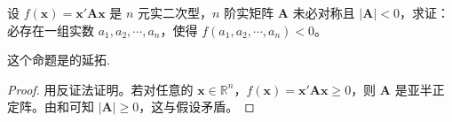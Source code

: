 \documentclass[../../main.tex]{subfiles}%
\begin{document}
\begin{proposition}\label{proposition:对应矩阵的行列式小于零的二次型必存在小于零的一点}
设 \(f(\boldsymbol{x})=\boldsymbol{x}'\boldsymbol{A}\boldsymbol{x}\) 是 \(n\) 元实二次型，\(n\) 阶实矩阵 \(\boldsymbol{A}\) 未必对称且 \(|\boldsymbol{A}|<0\)，求证：必存在一组实数 \(a_1,a_2,\cdots,a_n\)，使得 \(f(a_1,a_2,\cdots,a_n)<0\)。
\end{proposition}
\begin{remark}
这个命题是的延拓.
\end{remark}
\begin{proof}

用反证法证明。若对任意的 \(\boldsymbol{x}\in\mathbb{R}^n\)，\(f(\boldsymbol{x})=\boldsymbol{x}'\boldsymbol{A}\boldsymbol{x}\geqslant 0\)，则 \(\boldsymbol{A}\) 是亚半正定阵。由和可知 \(|\boldsymbol{A}|\geqslant 0\)，这与假设矛盾。

\end{proof}
\end{document}
